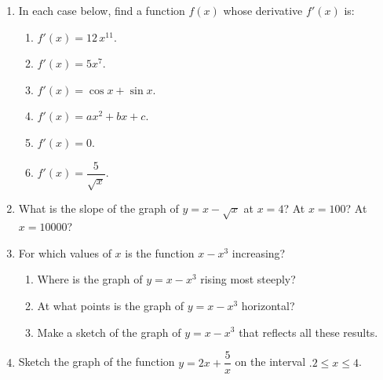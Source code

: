 \begin{enumerate}
\begin{enumerate}
  \item $f(x) = x^{-1}$ on $1 \leq x \leq 8$.

  \item $f(x) = \sqrt{x}$ on $.25 \leq x \leq 9$.

  \item $f(x) = \sin{x}$ on $0 \leq x \leq 2\pi$.




The graphs of $g$ and $h$ should coincide---or ``share phosphor''---in
each case.  Do they?



\end{enumerate}
\item In each case below, find a function $f(x)$ whose derivative
$f'(x)$ is:


  \begin{enumerate}
  \item $f'(x) = 12\,x^{11}$.

  \item $f'(x) = 5x^7$.

  \item $f'(x) = \cos{x} + \sin{x}$.

  \item $f'(x) = ax^2 + bx +c$.

  \item $f'(x) = 0$.

  \item $f'(x) = \dfrac{5}{\sqrt{x}}$.



\end{enumerate}
\item What is the slope of the graph of $y = x - \sqrt{x}$ at $x = 4$?
At $x = 100$?  At $x = 10000$?


\item For which values of $x$ is the function $x - x^3$ increasing?

  \begin{enumerate}
  \item Where is the graph of $y = x - x^3$ rising most steeply?

  \item At what points is the graph of $y = x - x^3$ horizontal?

  \item Make a sketch of the graph of $y = x - x^3$ that reflects all
these results.



\end{enumerate}
\item Sketch the graph of the function $y = 2x + \dfrac{5}{x}$ on the
interval $.2 \leq x \leq 4$.


\end{enumerate}
